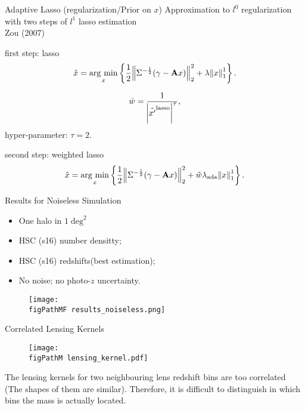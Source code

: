\begin{frame}{Adaptive Lasso (regularization/Prior on $x$)}
\alert{Approximation to $l^0$ regularization with two steps of
$l^1$ lasso estimation}\\
Zou (2007)
\begin{alertblock}{first step: lasso}
\begin{equation}\notag
\hat{x}=\mathop{\rm arg~min}\limits_{x} \left\{ \frac{1}{2} \norm{\Sigma^{-\frac{1}{2}}(\gamma-\mathbf{A}x)}^2_2 +
\lambda \norm{x}^1_1\right\}.
\end{equation}
\end{alertblock}
\begin{equation}
\hat{w}= \frac{1}{\abs{\hat{x'}^{\rm{lasso}}}^\tau},
\end{equation}
hyper-parameter: $\tau=2$.
\begin{alertblock}{second step: weighted lasso}
\begin{equation}\notag
\hat{x}=\mathop{\rm arg~min}\limits_{x} \left\{ \frac{1}{2} \norm{\Sigma^{-\frac{1}{2}}(\gamma-\mathbf{A}x)}^2_2 +
\hat{w}\lambda_{\rm{ada}} \norm{x}^1_1\right\}.
\end{equation}
\end{alertblock}
\end{frame}


\begin{frame}{Results for Noiseless Simulation}
\begin{itemize}
    \item One halo in $1\deg^2$
    \item HSC (s16) number densitty;
    \item HSC (s16) redshifts(best estimation);
    \item No noise; no photo-$z$ uncertainty.
\end{itemize}
\begin{figure}
\centering
\texttt{[image: \\figPathMF results\_noiseless.png]}
\end{figure}
\end{frame}


\begin{frame}{Correlated Lensing Kernels}
\begin{figure}
 \centering
 \texttt{[image: \\figPathM lensing\_kernel.pdf]}
\end{figure}
\alert{The lensing kernels for two neighbouring lens redshift bins
are too correlated (The shapes of them are similar). Therefore, it
is difficult to distinguish in which bins the mass is actually
located.}
\end{frame}


